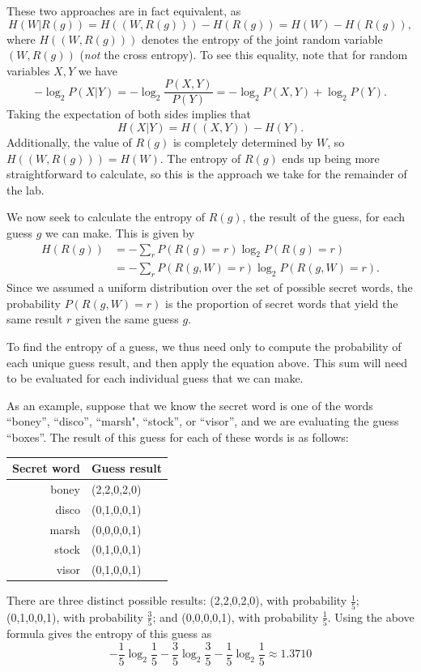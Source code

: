 These two approaches are in fact equivalent, as
\[
H(W|R(g)) = H((W,R(g))) -H(R(g)) = H(W)-H(R(g))
,
\]
where \(H((W,R(g)))\) denotes the entropy of the joint random variable \((W,R(g))\) (\textit{not} the cross entropy).
To see this equality, note that for random variables \(X,Y\) we have
\[
-\log_2 P(X|Y)
=-\log_2\frac{P(X,Y)}{P(Y)}
=-\log_2 P(X,Y)
+\log_2 P(Y).
\]
Taking the expectation of both sides implies that
\[
H(X|Y)=H((X,Y))-H(Y).
\]
Additionally, the value of \(R(g)\) is completely determined by \(W\), so \(H((W,R(g))) = H(W)\).
The entropy of \(R(g)\) ends up being more straightforward to calculate, so this is the approach we take for the remainder of the lab.

We now seek to calculate the entropy of \(R(g)\), the result of the guess, for each guess \(g\) we can make.
This is given by
\begin{align*}
H(R(g)) &=
-\sum_r P(R(g)=r)\log_2 P(R(g)=r)
\\&=
-\sum_r P(R(g,W)=r)\log_2 P(R(g,W)=r).
\end{align*}
Since we assumed a uniform distribution over the set of possible secret words, the probability \(P(R(g,W)=r)\) is the proportion of secret words that yield the same result \(r\) given the same guess \(g\).

To find the entropy of a guess, we thus need only to compute the probability of each unique guess result, and then apply the equation above.
This sum will need to be evaluated for each individual guess that we can make.

As an example, suppose that we know the secret word is one of the words ``boney'', ``disco'', ``marsh", ``stock'', or ``visor'', and we are evaluating the guess ``boxes''.
The result of this guess for each of these words is as follows:
\begin{center}
\begin{tabular}{r|l}
Secret word & Guess result \\ \hline
boney & (2,2,0,2,0) \\
disco & (0,1,0,0,1) \\
marsh & (0,0,0,0,1) \\
stock & (0,1,0,0,1) \\
visor & (0,1,0,0,1)
\end{tabular}
\end{center}
There are three distinct possible results: (2,2,0,2,0), with probability \(\frac{1}{5}\); (0,1,0,0,1), with probability \(\frac{3}{5}\); and (0,0,0,0,1), with probability \(\frac{1}{5}\).
Using the above formula gives the entropy of this guess as
\[
-\frac{1}{5}\log_2\frac{1}{5}
-\frac{3}{5}\log_2\frac{3}{5}
-\frac{1}{5}\log_2\frac{1}{5}
\approx 1.3710
\]

